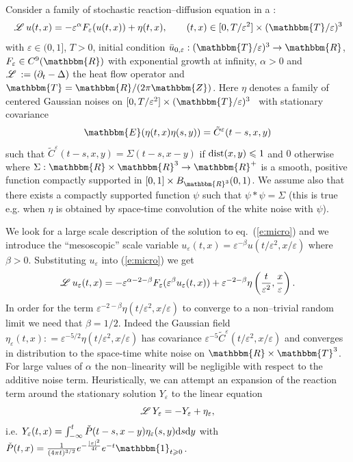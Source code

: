Consider a family of stochastic reaction--diffusion equation in a
:
\begin{equation}
  \LL u (t, x) = - \varepsilon^{\alpha} F_{\varepsilon} (u (t, x)) + \eta (t,
  x), \label{e:micro} \qquad (t, x) \in [0, T / \varepsilon^2] \times
  (\mathbbm{T}/ \varepsilon)^3
\end{equation}
with $\varepsilon \in (0, 1]$, $T > 0$, initial condition $\bar{u}_{0,
\varepsilon} : (\mathbbm{T}/ \varepsilon)^3 \rightarrow \mathbbm{R}$,
$F_{\varepsilon} \in C^9 (\mathbbm{R})$ with exponential growth at infinity,
$\alpha > 0$ and $\mathscr{L} \hspace{.2em} : = (\partial_t - \Delta)$ the heat flow operator and
$\mathbbm{T}=\mathbbm{R}/ (2 \pi \mathbbm{Z})$. Here $\eta$ denotes a family
of centered Gaussian noises on $[0, T / \varepsilon^2] \times (\mathbbm{T}/
\varepsilon)^3$ \ with stationary covariance
\[ \mathbbm{E} (\eta (t, x) \eta (s, y)) = \tilde{C}^{\varepsilon} (t - s, x,
   y) \]
such that $\tilde{C}^{\varepsilon} (t - s, x, y) = \Sigma (t - s, x - y)$ if
$\operatorname{dist} (x, y) \leqslant 1$ and $0$ otherwise where $\Sigma : \mathbbm{R}
\times \mathbbm{R}^3 \rightarrow \mathbbm{R}^+$ is a smooth, positive function
compactly supported in $[0, 1] \times B_{\mathbbm{R}^3} (0, 1)$. We assume
also that there exists a compactly supported function $\psi$ such that $\psi
\ast \psi = \Sigma$ (this is true e.g. when $\eta$ is obtained by space-time
convolution of the white noise with $\psi$).

We look for a large scale description of the solution to eq.~(\ref{e:micro})
and we introduce the ``mesoscopic'' scale variable $u_{\varepsilon} (t, x) =
\varepsilon^{- \beta} u (t / \varepsilon^2, x / \varepsilon)$ where $\beta >
0$. Substituting $u_{\varepsilon}$ into (\ref{e:micro}) we get
\begin{equation}
  \mathscr{L} \hspace{.2em} u_{\varepsilon} (t, x) = - \varepsilon^{\alpha - 2 - \beta}
  F_{\varepsilon} (\varepsilon^{\beta} u_{\varepsilon} (t, x)) +
  \varepsilon^{- 2 - \beta} \eta \left( \frac{t}{\varepsilon^2},
  \frac{x}{\varepsilon} \right) . \label{e:micro-2}
\end{equation}
In order for the term $\varepsilon^{- 2 - \beta} \eta (t / \varepsilon^2, x /
\varepsilon)$ to converge to a non--trivial random limit we need that $\beta =
1 / 2$. Indeed the Gaussian field $\eta_{\varepsilon} (t, x) : =
\varepsilon^{- 5 / 2} \eta (t / \varepsilon^2, x / \varepsilon)$ has
covariance $\varepsilon^{- 5} \tilde{C}^{\varepsilon} (t / \varepsilon^2, x /
\varepsilon)$ and converges in distribution to the space-time white noise on
$\mathbbm{R} \times \mathbbm{T}^3$. For large values of $\alpha$ the
non--linearity will be negligible with respect to the additive noise term.
Heuristically, we can attempt an expansion of the reaction term around the
stationary solution $Y_{\varepsilon}$ to the linear equation
\begin{equation}
  \mathscr{L} \hspace{.2em} Y_{\varepsilon} = - Y_{\varepsilon} + \eta_{\varepsilon},
  \label{e:Y-stat-eq}
\end{equation}
i.e. $Y_{\varepsilon} (t, x) = \int_{- \infty}^t \check{P} (t - s, x - y)
\eta_{\varepsilon} (s, y) \mathrm{d} s \mathrm{d} y$ with $\check{P} (t, x) =
\frac{1}{(4 \mathpi t)^{3 / 2}} e^{- \frac{| x |^2}{4 t}} e^{- t} 
\mathbbm{1}_{t \geqslant 0}$.

